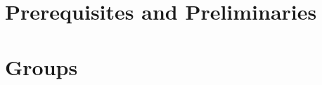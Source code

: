 \documentclass{article}
\theoremstyle{definition}
\begin{document}
    \addtocounter{part}{-1}
    \part{Prerequisites and Preliminaries}
    \addtocounter{section}{6}
    
    \part{Groups}
    
\end{document}
